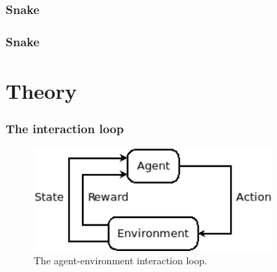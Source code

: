 \documentclass{beamer}
\begin{document}
    \begin{frame}
        \frametitle{Snake}
        \centering
    \end{frame}

    \begin{frame}
        \frametitle{Snake}
        \centering
    \end{frame}

    \section{Theory}

    \begin{frame}
        \frametitle{The interaction loop}
        \begin{figure}[H]
            \includegraphics[width=0.8\textwidth]{../report/images/agent_env}
            \caption{The agent-environment interaction loop.}
            \label{fig:agent_env}
        \end{figure}
    \end{frame}
\end{document}
